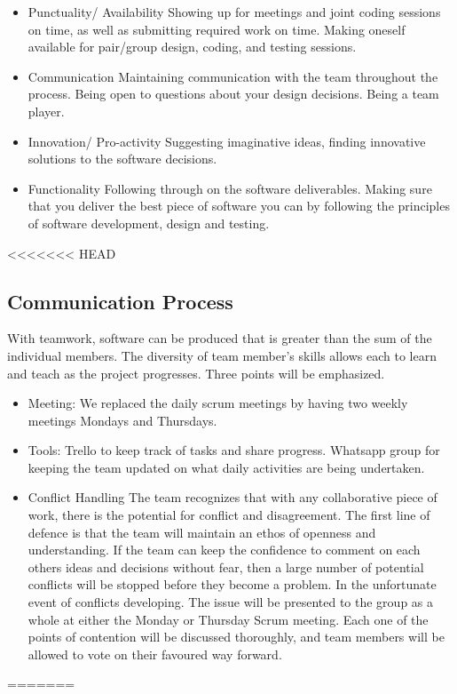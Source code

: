 \documentclass[11pt]{article}
\begin{document}
\begin{itemize}
	\item Punctuality/ Availability
	\subitem Showing up for meetings and joint coding sessions on time, as well as submitting required work on time.
	Making oneself available for pair/group design, coding, and testing sessions.
	
	\item Communication
	\subitem Maintaining communication with the team throughout the process. Being open to questions about your design decisions. Being a team player.
	
	\item Innovation/ Pro-activity
	\subitem Suggesting imaginative ideas, finding innovative solutions to the software decisions.
	
	\item Functionality
	\subitem Following through on the software deliverables. Making sure that you deliver the best piece of software you can by following the principles of software development, design and testing.
\end{itemize}

<<<<<<< HEAD
\subsection{Communication Process}
With teamwork, software can be produced that is greater than the sum of the individual members. The diversity of team member's skills allows each to learn and teach as the project progresses. Three points will be emphasized.
\begin{itemize}
	\item Meeting: We replaced the daily scrum meetings by having two weekly meetings Mondays and Thursdays.
	\item Tools: Trello to keep track of tasks and share progress. Whatsapp group for keeping the team updated on what daily activities are being undertaken.
	\item Conflict Handling
	\subitem The team recognizes that with any collaborative piece of work, there is the potential for conflict and disagreement. The first line of defence is that the team will maintain an ethos of openness and understanding. If the team can keep the confidence to comment on each others ideas and decisions without fear, then a large number of potential conflicts will be stopped before they become a problem.
	\subitem In the unfortunate event of conflicts developing. The issue will be presented to the group as a whole at either the Monday or Thursday Scrum meeting. Each one of the points of contention will be discussed thoroughly, and team members will be allowed to vote on their favoured way forward.
\end{itemize}
=======
\end{document}
